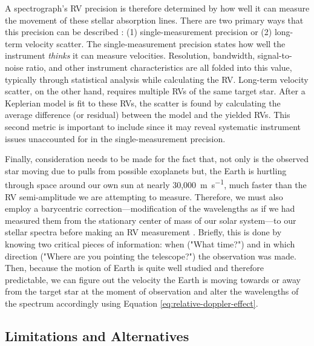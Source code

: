 A spectrograph's RV precision is therefore determined by how well it can measure the movement of these stellar absorption lines. There are two primary ways that this precision can be described \citep{fischer_state_2016}: (1) single-measurement precision or (2) long-term velocity scatter. The single-measurement precision states how well the instrument \textit{thinks} it can measure velocities. Resolution, bandwidth, signal-to-noise ratio, and other instrument characteristics are all folded into this value, typically through statistical analysis while calculating the RV. Long-term velocity scatter, on the other hand, requires multiple RVs of the same target star. After a Keplerian model is fit to these RVs, the scatter is found by calculating the average difference (or residual) between the model and the yielded RVs. This second metric is important to include since it may reveal systematic instrument issues unaccounted for in the single-measurement precision.

Finally, consideration needs to be made for the fact that, not only is the observed star moving due to pulls from possible exoplanets but, the Earth is hurtling through space around our own sun at nearly 30,000~\si{\meter\per\second}, much faster than the RV semi-amplitude we are attempting to measure. Therefore, we must also employ a barycentric correction---modification of the wavelengths as if we had measured them from the stationary center of mass of our solar system---to our stellar spectra before making an RV measurement \citep{wright_barycentric_2014}. Briefly, this is done by knowing two critical pieces of information: when ("What time?") and in which direction ("Where are you pointing the telescope?") the observation was made. Then, because the motion of Earth is quite well studied and therefore predictable, we can figure out the velocity the Earth is moving towards or away from the target star at the moment of observation and alter the wavelengths of the spectrum accordingly using Equation \ref{eq:relative-doppler-effect}.

\subsection{Limitations and Alternatives}

